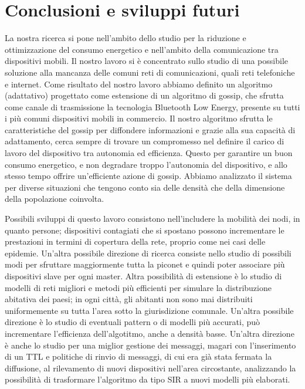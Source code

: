 \chapter{Conclusioni e sviluppi futuri}
\label{chap:conclusioni_sviluppiFuturi}

La nostra ricerca si pone nell'ambito dello studio per la riduzione e ottimizzazione del consumo energetico e nell'ambito della comunicazione tra dispositivi mobili.  Il nostro lavoro si è concentrato sullo studio di una possibile soluzione alla mancanza delle comuni reti di comunicazioni, quali reti telefoniche e internet. Come risultato del nostro lavoro abbiamo definito un algoritmo (adattativo) progettato come estensione di un algoritmo di gossip, che sfrutta come canale di trasmissione la tecnologia Bluetooth Low Energy, presente su tutti i più comuni dispositivi mobili in commercio. Il nostro algoritmo sfrutta le caratteristiche del gossip per diffondere informazioni e grazie alla sua capacità di adattamento, cerca sempre di trovare un compromesso nel definire il carico di lavoro del dispositivo tra autonomia ed efficienza. Questo per garantire un buon consumo energetico, e non degradare troppo l'autonomia del dispositivo, e allo stesso tempo offrire un'efficiente azione di gossip. Abbiamo analizzato il sistema per diverse situazioni che tengono conto sia delle densità che della dimensione della popolazione coinvolta.

Possibili sviluppi di questo lavoro consistono nell'includere la mobilità dei nodi, in quanto persone; dispositivi contagiati che si spostano possono incrementare le prestazioni in termini di copertura della rete, proprio come nei casi delle epidemie. Un'altra possibile direzione di ricerca consiste nello studio di possibili modi per sfruttare maggiormente tutta la piconet e quindi poter associare più dispositivi slave per ogni master. Altra possibilità di estensione è lo studio di modelli di reti migliori e metodi più efficienti per simulare la distribuzione abitativa dei paesi; in ogni città, gli abitanti non sono mai distribuiti uniformemente su tutta l'area sotto la giurisdizione comunale. Un'altra possibile direzione è lo studio di eventuali pattern o di modelli più accurati, può incrementare l'efficienza dell'algotitmo, anche a densità basse. Un'altra direzione è anche lo studio per una miglior gestione dei messaggi, magari con l'inserimento di un \acf{TTL} e politiche di rinvio di messaggi, di cui era già stata fermata la diffusione, al rilevamento di nuovi dispositivi nell'area circostante, analizzando la possibilità di trasformare l'algoritmo da tipo \acs{SIR} a nuovi modelli più elaborati.